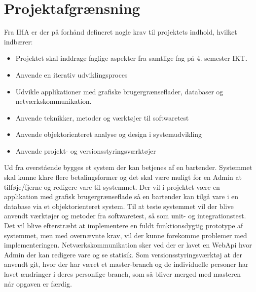 \chapter{Projektafgrænsning}
Fra IHA  er der på forhånd defineret nogle krav til projektets indhold, hvilket indbærer:
\begin{itemize}
\item Projektet skal inddrage faglige aspekter fra samtlige fag på 4. semester IKT. 
\item Anvende en iterativ udviklingsproces
\item Udvikle applikationer med grafiske brugergrænseflader, databaser og
netværkskommunikation.
\item Anvende teknikker, metoder og værktøjer til softwaretest
\item Anvende objektorienteret analyse og design i systemudvikling
\item Anvende projekt- og versionsstyringsværktøjer
\newline\newline
\end{itemize}

Ud fra overstående bygges et system der kan betjenes af en bartender. Systemmet skal kunne klare flere betalingsformer og det skal være muligt for en Admin at tilføje/fjerne og redigere vare til systemmet.  
\newline\newline
Der vil i projektet være en applikation med grafisk brugergrænseflade så en bartender kan tilgå vare i en database via et objektorienteret system. 
\newline\newline
Til at teste systemmet vil der blive anvendt værktøjer og metoder fra softwaretest, så som unit- og integrationstest. 
\newline\newline
Det vil blive efterstræbt at implementere en fuldt funktionsdygtig prototype af systemmet, men med overnævnte krav, vil der kunne forekomme problemer med implementeringen. 
\newline\newline
Netværkskommunikation sker ved der er lavet en WebApi hvor Admin der kan redigere vare og se statisik.  
\newline\newline
Som versionsstyringsværktøj at der anvendt git, hvor der har været et master-branch og de individuelle personer har lavet ændringer i deres personlige branch, som så bliver merged med masteren når opgaven er færdig.  
